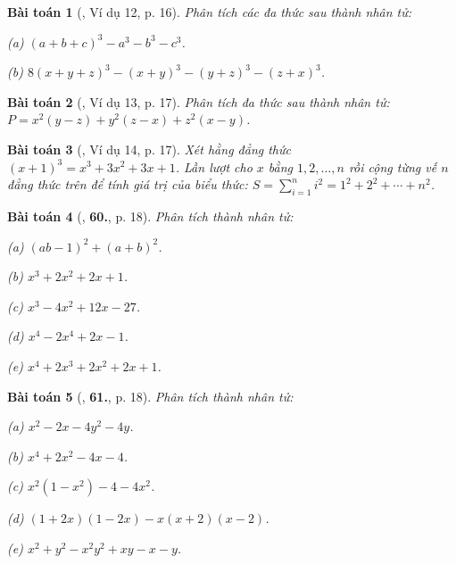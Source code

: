 \documentclass{article}
\numberwithin{equation}{section}
\newtheorem{baitoan}{Bài toán}[section]
\begin{document}
\begin{baitoan}[\cite{Binh_Toan_8_tap_1}, Ví dụ 12, p. 16]
	Phân tích các đa thức sau thành nhân tử:
	\begin{enumerate*}
		\item[(a)] $(a + b + c)^3 - a^3 - b^3 - c^3$.
		\item[(b)] $8(x + y + z)^3 - (x + y)^3 - (y + z)^3 - (z + x)^3$.
	\end{enumerate*}
\end{baitoan}

\begin{baitoan}[\cite{Binh_Toan_8_tap_1}, Ví dụ 13, p. 17]
	Phân tích đa thức sau thành nhân tử: $P = x^2(y - z) + y^2(z - x) + z^2(x -y)$.
\end{baitoan}

\begin{baitoan}[\cite{Binh_Toan_8_tap_1}, Ví dụ 14, p. 17]
	Xét hằng đẳng thức $(x + 1)^3 = x^3 + 3x^2 + 3x + 1$. Lần lượt cho $x$ bằng $1,2,\ldots,n$ rồi cộng từng vế $n$ đẳng thức trên để tính giá trị của biểu thức: $S = \sum_{i=1}^n i^2 = 1^2 + 2^2 + \cdots + n^2$.
\end{baitoan}

\begin{baitoan}[\cite{Binh_Toan_8_tap_1}, \textbf{60.}, p. 18]
	Phân tích thành nhân tử:
	\begin{enumerate*}
		\item[(a)] $(ab - 1)^2 + (a + b)^2$.
		\item[(b)] $x^3 + 2x^2 + 2x + 1$.
		\item[(c)] $x^3 - 4x^2 + 12x - 27$.
		\item[(d)] $x^4 - 2x^4 + 2x - 1$.
		\item[(e)] $x^4 + 2x^3 + 2x^2 + 2x + 1$.
	\end{enumerate*}
\end{baitoan}

\begin{baitoan}[\cite{Binh_Toan_8_tap_1}, \textbf{61.}, p. 18]
	Phân tích thành nhân tử:
	\begin{enumerate*}
		\item[(a)] $x^2 - 2x - 4y^2 - 4y$.
		\item[(b)] $x^4 + 2x^2 - 4x - 4$.
		\item[(c)] $x^2(1 - x^2) - 4 - 4x^2$.
		\item[(d)] $(1 + 2x)(1 - 2x) - x(x + 2)(x - 2)$.
		\item[(e)] $x^2 + y^2 - x^2y^2 + xy - x - y$.
	\end{enumerate*}
\end{baitoan}
\end{document}
